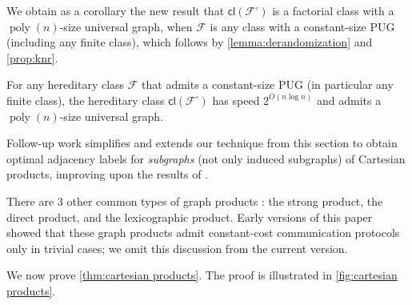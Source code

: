 \documentclass{article}
\makeatletter
\DeclareMathOperator{\poly}{poly}
\newcommand{\cF}{\ensuremath{\mathcal{F}}}
\newcommand{\cl}{\mathsf{cl}}
\newcommand\IfRestateTF{%
  \ifx\label\thmt@gobble@label %
    \expandafter\@firstoftwo
  \else
    \expandafter\@secondoftwo
  \fi
}
\newcommand{\RestateRemark}{\IfRestateTF{{\normalfont\bfseries (Restated) }}{}}
\makeatother
\begin{document}


We obtain as a corollary the new result that $\cl(\cF^\square)$ is a factorial class with a
$\poly(n)$-size universal graph, when $\cF$ is any class with a constant-size PUG (including any
finite class), which follows by \cref{lemma:derandomization} and \cref{prop:knr}.
\begin{corollary}
For any hereditary class $\cF$ that admits a constant-size PUG (in particular any finite class), the
hereditary class $\cl(\cF^\square)$ has speed $2^{O(n \log n)}$ and admits a $\poly(n)$-size universal
graph.
\end{corollary}

Follow-up work \cite{EHZ23} simplifies and extends our technique from this section to obtain optimal
adjacency labels for \emph{subgraphs} (not only induced subgraphs) of Cartesian products, improving
upon the results of \cite{CLR20}.

\begin{remark}
There are 3 other common types of graph products \cite{HIK11}: the strong product, the direct
product, and the lexicographic product. Early versions of this paper showed that these graph
products admit constant-cost communication protocols only in trivial cases; we omit this discussion
from the current version.
\end{remark}

We now prove \cref{thm:cartesian products}.  The proof is illustrated in \cref{fig:cartesian
products}. 
\end{document}
